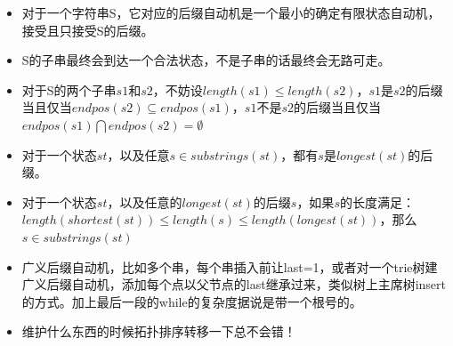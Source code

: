 \documentclass[UTF8,a4paper,titlepage]{ctexart}
\begin{document}
\begin{itemize}
\item 对于一个字符串S，它对应的后缀自动机是一个最小的确定有限状态自动机，接受且只接受S的后缀。
\item S的子串最终会到达一个合法状态，不是子串的话最终会无路可走。
\item 对于S的两个子串$s1$和$s2$，不妨设$length(s1) \leq length(s2)$，$s1$是$s2$的后缀当且仅当$endpos(s2) \subseteq endpos(s1)$，$s1$不是$s2$的后缀当且仅当$endpos(s1) \bigcap endpos(s2) = \emptyset$
\item 对于一个状态$st$，以及任意$s \in substrings(st)$，都有$s$是$longest(st)$的后缀。
\item 对于一个状态$st$，以及任意的$longest(st)$的后缀$s$，如果$s$的长度满足：$length(shortest(st)) \leq length(s) \leq length(longest(st))$，那么$s \in substrings(st)$
\item 广义后缀自动机，比如多个串，每个串插入前让last=1，或者对一个trie树建广义后缀自动机，添加每个点以父节点的last继承过来，类似树上主席树insert的方式。加上最后一段的while的复杂度据说是带一个根号的。
\item 维护什么东西的时候拓扑排序转移一下总不会错！
\end{itemize}
\end{document}
